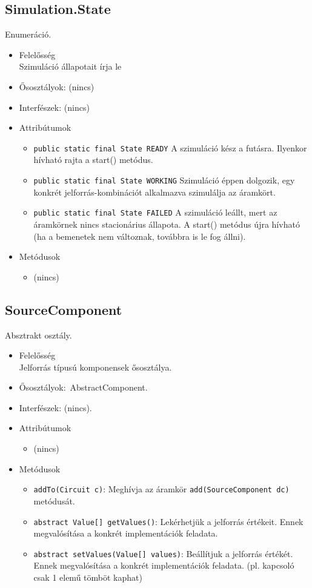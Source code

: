 \subsection{Simulation.State}
Enumeráció.
\begin{itemize}
\item Felelősség\\
Szimuláció állapotait írja le
\item Ősosztályok: (nincs)
\item Interfészek: (nincs)
\item Attribútumok $\ $
\begin{itemize}
	\item \texttt{public static final State READY} A szimuláció kész a futásra. Ilyenkor hívható rajta a start() metódus.
	\item \texttt{public static final State WORKING} Szimuláció éppen dolgozik, egy konkrét jelforrás-kombinációt alkalmazva szimulálja az áramkört.
	\item \texttt{public static final State FAILED} A szimuláció leállt, mert az áramkörnek nincs stacionárius állapota. A start() metódus újra hívható (ha a bemenetek nem változnak, továbbra is le fog állni).
\end{itemize}
\item Metódusok$\ $
\begin{itemize}
\item (nincs)
\end{itemize}
\end{itemize}

\subsection{SourceComponent}
Absztrakt osztály.
\begin{itemize}
\item Felelősség\\
Jelforrás típusú komponensek ősosztálya.
\item Ősosztályok:\ AbstractComponent.
\item Interfészek: (nincs).
\item Attribútumok $\ $
\begin{itemize}
	\item (nincs)
\end{itemize}
\item Metódusok$\ $
\begin{itemize}
\item \texttt{addTo(Circuit c)}: Meghívja az áramkör \texttt{add(SourceComponent dc)} metódusát.
	\item \texttt{abstract Value[] getValues()}: Lekérhetjük a jelforrás értékeit. Ennek megvalósítása a konkrét implementációk feladata.
	\item \texttt{abstract setValues(Value[] values)}: Beállítjuk a jelforrás értékét. Ennek megvalósítása a konkrét implementációk feladata. (pl. kapcsoló csak 1 elemű tömböt kaphat)
\end{itemize}
\end{itemize}





